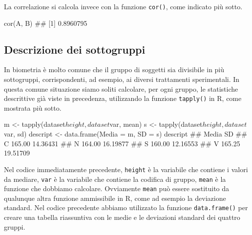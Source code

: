 \documentclass[a4paper,12pt,oneside]{book}
\newenvironment{Shaded}{\begin{snugshade}}{\end{snugshade}}
\newcommand{\SpecialCharTok}[1]{#1}
\newcommand{\DocumentationTok}[1]{#1}
\newcommand{\OtherTok}[1]{#1}
\newcommand{\FunctionTok}[1]{#1}
\newcommand{\AttributeTok}[1]{#1}
\newcommand{\NormalTok}[1]{#1}
\begin{document}
La correlazione si calcola invece con la funzione \texttt{cor()}, come indicato più sotto.

\begin{Shaded}
\begin{Highlighting}[]
\FunctionTok{cor}\NormalTok{(A, B)}
\DocumentationTok{\#\# [1] 0.8960795}
\end{Highlighting}
\end{Shaded}

\hypertarget{descrizione-dei-sottogruppi}{%
\subsection{Descrizione dei sottogruppi}\label{descrizione-dei-sottogruppi}}

In biometria è molto comune che il gruppo di soggetti sia divisibile in più sottogruppi, corrispondenti, ad esempio, ai diversi trattamenti sperimentali. In questa comune situazione siamo soliti calcolare, per ogni gruppo, le statistiche descrittive già viste in precedenza, utilizzando la funzione \texttt{tapply()} in R, come mostrata più sotto.

\begin{Shaded}
\begin{Highlighting}[]
\NormalTok{m }\OtherTok{\textless{}{-}} \FunctionTok{tapply}\NormalTok{(dataset}\SpecialCharTok{$}\NormalTok{height, dataset}\SpecialCharTok{$}\NormalTok{var, mean)}
\NormalTok{s }\OtherTok{\textless{}{-}} \FunctionTok{tapply}\NormalTok{(dataset}\SpecialCharTok{$}\NormalTok{height, dataset}\SpecialCharTok{$}\NormalTok{var, sd)}
\NormalTok{descript }\OtherTok{\textless{}{-}} \FunctionTok{data.frame}\NormalTok{(}\AttributeTok{Media =}\NormalTok{ m, }\AttributeTok{SD =}\NormalTok{ s)}
\NormalTok{descript}
\DocumentationTok{\#\#    Media       SD}
\DocumentationTok{\#\# C 165.00 14.36431}
\DocumentationTok{\#\# N 164.00 16.19877}
\DocumentationTok{\#\# S 160.00 12.16553}
\DocumentationTok{\#\# V 165.25 19.51709}
\end{Highlighting}
\end{Shaded}

Nel codice immediatamente precedente, \texttt{height} è la variabile che contiene i valori da mediare, \texttt{var} è la variabile che contiene la codifica di gruppo, \texttt{mean} è la funzione che dobbiamo calcolare. Ovviamente \texttt{mean} può essere sostituito da qualunque altra funzione ammissibile in R, come ad esempio la deviazione standard. Nel codice precedente abbiamo utilizzato la funzione \texttt{data.frame()} per creare una tabella riassuntiva con le medie e le deviazioni standard dei quattro gruppi.
\end{document}
